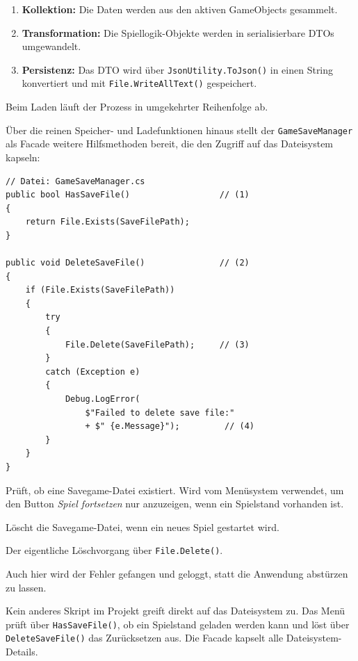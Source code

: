 \documentclass[12pt,a4paper]{article}
\begin{document}
\begin{enumerate}
    \item \textbf{Kollektion:} Die Daten werden aus den aktiven GameObjects gesammelt.
    \item \textbf{Transformation:} Die Spiellogik-Objekte werden in serialisierbare DTOs umgewandelt.
    \item \textbf{Persistenz:} Das DTO wird über \texttt{JsonUtility.ToJson()} in einen String konvertiert und mit \texttt{File.WriteAllText()} gespeichert.
\end{enumerate}

Beim Laden läuft der Prozess in umgekehrter Reihenfolge ab.

Über die reinen Speicher- und Ladefunktionen hinaus stellt der \texttt{GameSaveManager} als Facade weitere Hilfsmethoden bereit, die den Zugriff auf das Dateisystem kapseln:

\begin{lstlisting}
// Datei: GameSaveManager.cs
public bool HasSaveFile()                  // (1)
{
    return File.Exists(SaveFilePath);
}

public void DeleteSaveFile()               // (2)
{
    if (File.Exists(SaveFilePath))
    {
        try
        {
            File.Delete(SaveFilePath);     // (3)
        }
        catch (Exception e)
        {
            Debug.LogError(
                $"Failed to delete save file:"
                + $" {e.Message}");         // (4)
        }
    }
}
\end{lstlisting}

\begin{description}[leftmargin=2em, labelwidth=1.5em]
    \item[(1)] Prüft, ob eine Savegame-Datei existiert. Wird vom Menüsystem verwendet, um den Button \textit{Spiel fortsetzen} nur anzuzeigen, wenn ein Spielstand vorhanden ist.
    \item[(2)] Löscht die Savegame-Datei, wenn ein neues Spiel gestartet wird.
    \item[(3)] Der eigentliche Löschvorgang über \texttt{File.Delete()}.
    \item[(4)] Auch hier wird der Fehler gefangen und geloggt, statt die Anwendung abstürzen zu lassen.
\end{description}

Kein anderes Skript im Projekt greift direkt auf das Dateisystem zu. Das Menü prüft über \texttt{HasSaveFile()}, ob ein Spielstand geladen werden kann und löst über \texttt{DeleteSaveFile()} das Zurücksetzen aus. Die Facade kapselt alle Dateisystem-Details.
\end{document}
